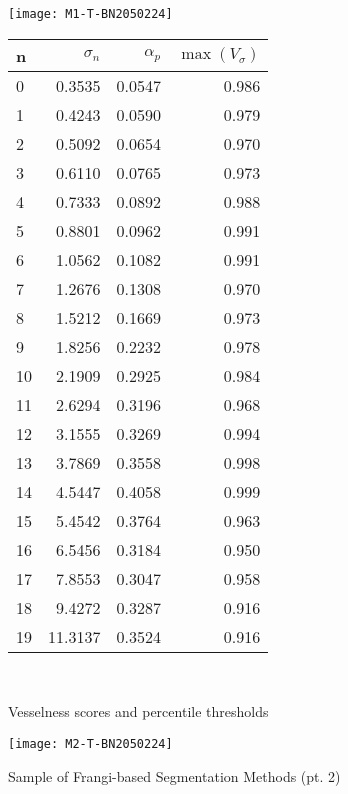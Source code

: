 \begin{figure}
\begin{minipage}[tp]{0.5\textwidth}
  \texttt{[image: M1-T-BN2050224]}
  \end{minipage}
\quad
  \begin{minipage}[tp]{0.35\textwidth}
  \begin{tabular}{l|r|r|r}
    n  & $\sigma_n$  &  $\alpha_p$  &  $\max(V_\sigma)$ \\
    \hline
    0  &   0.3535 &  0.0547 &  0.986\\
    1  &   0.4243 &  0.0590 &  0.979\\
    2  &   0.5092 &  0.0654 &  0.970\\
    3  &   0.6110 &  0.0765 &  0.973\\
    4  &   0.7333 &  0.0892 &  0.988\\
    5  &   0.8801 &  0.0962 &  0.991\\
    6  &   1.0562 &  0.1082 &  0.991\\
    7  &   1.2676 &  0.1308 &  0.970\\
    8  &   1.5212 &  0.1669 &  0.973\\
    9  &   1.8256 &  0.2232 &  0.978\\
    10 &   2.1909 &  0.2925 &  0.984\\
    11 &   2.6294 &  0.3196 &  0.968\\
    12 &   3.1555 &  0.3269 &  0.994\\
    13 &   3.7869 &  0.3558 &  0.998\\
    14 &   4.5447 &  0.4058 &  0.999\\
    15 &   5.4542 &  0.3764 &  0.963\\
    16 &   6.5456 &  0.3184 &  0.950\\
    17 &   7.8553 &  0.3047 &  0.958\\
    18 &   9.4272 &  0.3287 &  0.916\\
    19 &  11.3137 &  0.3524 &  0.916\\
    \end{tabular} \\
\end{minipage}
  \caption{Vesselness scores and percentile thresholds}
\end{figure}

\begin{figure}[p] \centering
 \texttt{[image: M2-T-BN2050224]}
 \caption{Sample of Frangi-based Segmentation Methods (pt. 2)}
  \end{figure}

